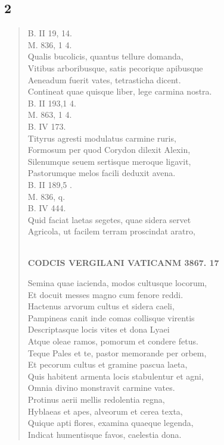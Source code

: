 \documentclass[11pt, a4paper]{report}
\begin{document}
            \subsection*{2}
      \begin{verse}
      B. II 19, 14. \\ M. 836, 1 4. \\ Qualis bucolicis, quantus tellure domanda, \\ Vitibus arboribusque, satis pecorique apibusque \\ Aeneadum fuerit vates, tetrasticha dicent. \\ Contineat quae quisque liber, lege carmina nostra. \\ B. II 193,1 4. \\ M. 863, 1 4. \\ B. IV 173. \\ Tityrus agresti modulatus carmine ruris, \\ Formosum per quod Corydon dilexit Alexin, \\ Silenumque seuem sertisque meroque ligavit, \\ Pastorumque melos facili deduxit avena. \\ B. II 189,5 . \\ M. 836, q. \\ B. IV 444. \\ Quid faciat laetas segetes, quae sidera servet \\ Agricola, ut facilem terram proscindat aratro, \\ 
        ﻿\pagebreak 
    \begin{center} \textbf{CODCIS VERGILANI VATICANM 3867. 17} \end{center}Semina quae iacienda, modos cultusque locorum, \\ Et docuit messes magno cum fenore reddi. \\ Hactenus arvorum cultus et sidera caeli, \\ Pampineas canit inde comas collisque virentis \\ Descriptasque locis vites et dona Lyaei \\ Atque oleae ramos, pomorum et condere fetus. \\ Teque Pales et te, pastor memorande per orbem, \\ Et pecorum cultus et gramine pascua laeta, \\ Quis habitent armenta locis stabulentur et agni, \\ Omnia divino monstravit carmine vates. \\ Protinus aerii mellis redolentia regna, \\ Hyblaeas et apes, alveorum et cerea texta, \\ Quique apti flores, examina quaeque legenda, \\ Indicat humentisque favos, caelestia dona. \\ 
      \end{verse}
  
\end{document}
